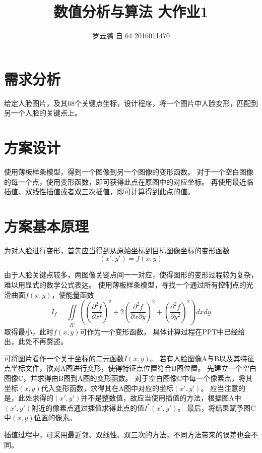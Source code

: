 \documentclass[11pt,a4paper]{ctexart}
\begin{document}
\title{数值分析与算法 \hspace{0.1in} 大作业1}
\author{罗云鹏 \hspace{0.1in} 自 64 \hspace{0.1in}2016011470}
\maketitle
\tableofcontents
\newpage

\section{需求分析}
给定人脸图片，及其68个关键点坐标，设计程序，将一个图片中人脸变形，匹配到另一个人脸的关键点上。

\section{方案设计}
使用薄板样条模型，得到一个图像到另一个图像的变形函数。
对于一个空白图像的每一个点，使用变形函数，即可获得此点在原图中的对应坐标。
再使用最近临插值、双线性插值或者双三次插值，即可计算得到此点的值。

\section{方案基本原理}
为对人脸进行变形，首先应当得到从原始坐标到目标图像坐标的变形函数$$(x', y') = f(x, y)$$

由于人脸关键点较多，两图像关键点间一一对应，使得图形的变形过程较为复杂，难以用显式的数学公式表达。
使用薄板样条模型，寻找一个通过所有控制点的光滑曲面$f(x, y)$，使能量函数
$$I_f = \iint\limits_{R^2}\left(\left( \dfrac{\partial^2 f}{\partial x^2}\right)^2 + 2 \left( \dfrac{\partial^2 f}{\partial x \partial y}\right)^2 + \left( \dfrac{\partial^2 f}{\partial y^2}\right)^2 \right) dx dy$$
取得最小，此时$f(x, y)$可作为一个变形函数。
具体计算过程在PPT中已经给出，此处不再赘述。

可将图片看作一个关于坐标的二元函数$I(x, y)$。
若有人脸图像A与B以及其特征点坐标文件，欲对A图进行变形，使得特征点位置符合B图位置。
先建立一个空白图像C，并求得由B图到A图的变形函数。
对于空白图像C中每一个像素点，将其坐标$(x, y)$代入变形函数，求得其在A图中对应的坐标$(x', y')$。
应当注意的是，此处求得的$(x', y')$并不是整数值，故应当使用插值的方法，根据图A中$(x', y')$附近的像素点通过插值求得此点的值$I^*(x', y')$。
最后，将结果赋予图C中$(x, y)$位置的像素。

插值过程中，可采用最近邻、双线性、双三次的方法，不同方法带来的误差也会不同。
\end{document}
